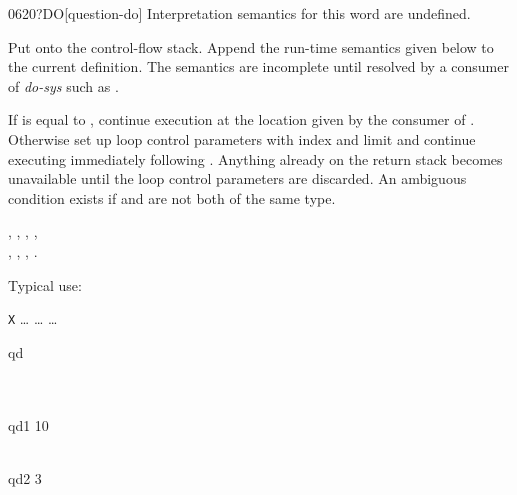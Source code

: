 \begin{worddef}[qDO]{0620}{?DO}[question-do]
\interpret
	Interpretation semantics for this word are undefined.

\compile

	Put  onto the control-flow stack. Append the
	run-time semantics given below to the current definition. The
	semantics are incomplete until resolved by a consumer of
	\emph{do-sys} such as .

\runtime

	If  is equal to , continue
	execution at the location given by the consumer of
	. Otherwise set up loop control parameters with
	index  and limit  and continue
	executing immediately following . Anything already
	on the return stack becomes unavailable until the loop
	control parameters are discarded. An ambiguous condition
	exists if  and  are not both of
	the same type.

\see {},
	,
	,
	, \\
	,
	,
	,
	.

	\begin{rationale} %
		Typical use:

		\tab \word{:} \texttt{X} {\ldots}  {\ldots}  {\ldots} \word{;}
	\end{rationale}

	\begin{testing} %
	\ttfamily

	\word{:} qd    \word{;} \\
	 \\
	 \\

	\word{:} qd1   10  \word{;} \\
	 \\

	\word{:} qd2   3        \word{;} \\


\end{testing}
\end{worddef}
